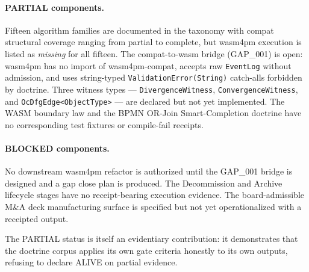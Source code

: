 \paragraph{PARTIAL components.} Fifteen algorithm families are documented in the taxonomy
with compat structural coverage ranging from partial to complete, but wasm4pm execution is
listed as \emph{missing} for all fifteen. The compat-to-wasm bridge (GAP\_001) is open:
wasm4pm has no import of wasm4pm-compat, accepts raw \texttt{EventLog} without admission,
and uses string-typed \texttt{ValidationError(String)} catch-alls forbidden by doctrine.
Three witness types --- \texttt{DivergenceWitness}, \texttt{ConvergenceWitness}, and
\texttt{OcDfgEdge\textless{}ObjectType\textgreater{}} --- are declared but not yet
implemented. The WASM boundary law and the BPMN OR-Join Smart-Completion doctrine have no
corresponding test fixtures or compile-fail receipts.

\paragraph{BLOCKED components.} No downstream wasm4pm refactor is authorized until the
GAP\_001 bridge is designed and a gap close plan is produced. The Decommission and Archive
lifecycle stages have no receipt-bearing execution evidence. The board-admissible M\&A deck
manufacturing surface is specified but not yet operationalized with a receipted output.

The PARTIAL status is itself an evidentiary contribution: it demonstrates that the doctrine
corpus applies its own gate criteria honestly to its own outputs, refusing to declare ALIVE
on partial evidence.
